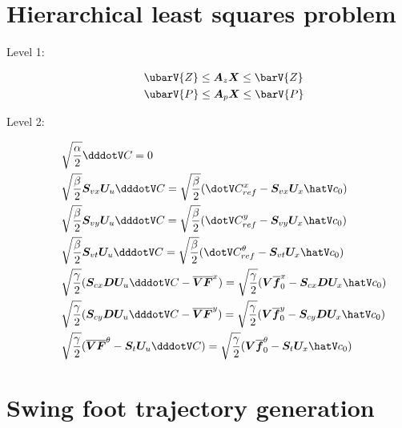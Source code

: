 \documentclass[a4paper]{article}
\begin{document}
\section*{Hierarchical least squares problem}
\begin{description}
    \item[Level 1:]
        \begin{equation}
        \begin{split}
            & \ubarV{Z} \le \M{A}_{z}\V{X} \le \barV{Z} \\
            & \ubarV{P} \le \M{A}_{p}\V{X} \le \barV{P}
        \end{split}
        \end{equation}

    \item[Level 2:]
        \begin{equation}
        \begin{split}
            & \sqrt{\frac{\alpha}{2}} \cJerk = 0 \\
            & \sqrt{\frac{\beta}{2}} \M{S}_{vx} \V{U}_{u} \cJerk = \sqrt{\frac{\beta}{2}} (\cVel^{x}_{ref} - \M{S}_{vx} \V{U}_{x} \cstate_{0})\\
            & \sqrt{\frac{\beta}{2}} \M{S}_{vy} \V{U}_{u} \cJerk = \sqrt{\frac{\beta}{2}} (\cVel^{y}_{ref} - \M{S}_{vy} \V{U}_{x} \cstate_{0})\\
            & \sqrt{\frac{\beta}{2}} \M{S}_{vt} \V{U}_{u} \cJerk = \sqrt{\frac{\beta}{2}} (\cVel^{\theta}_{ref} - \M{S}_{vt} \V{U}_{x} \cstate_{0})\\
            & \sqrt{\frac{\gamma}{2}} (\M{S}_{cx} \M{D} \V{U}_{u} \cJerk - \overline{\M{V}} \overline{\M{F}}^{x}) = \sqrt{\frac{\gamma}{2}} (\M{V}\overline{\M{f}}^{x}_{0} - \M{S}_{cx} \M{D} \V{U}_{x} \cstate_{0})\\
            & \sqrt{\frac{\gamma}{2}} (\M{S}_{cy} \M{D} \V{U}_{u} \cJerk - \overline{\M{V}} \overline{\M{F}}^{y}) = \sqrt{\frac{\gamma}{2}} (\M{V}\overline{\M{f}}^{y}_{0} - \M{S}_{cy} \M{D} \V{U}_{x} \cstate_{0})\\
            & \sqrt{\frac{\gamma}{2}} (\overline{\M{V}} \overline{\M{F}}^{\theta} - \M{S}_{t} \V{U}_{u} \cJerk) = \sqrt{\frac{\gamma}{2}} (\M{V}\overline{\M{f}}^{\theta}_{0} - \M{S}_{t} \V{U}_{x} \cstate_{0})\\
        \end{split}
        \end{equation}
\end{description}

\section*{Swing foot trajectory generation}
\end{document}
